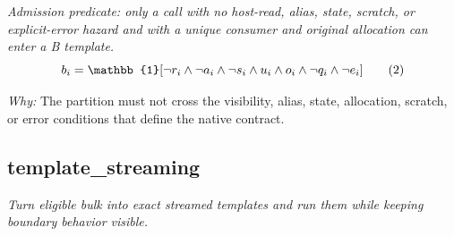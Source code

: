 \documentclass[10pt,a4paper]{article}
\begin{document}
\begin{enumerate}[leftmargin=*,start=1]
\noindent\emph{Admission predicate: only a call with no host-read, alias, state, scratch, or explicit-error hazard and with a unique consumer and original allocation can enter a B template.}
\begin{equation}
\resizebox{\ifdim\width>\linewidth \linewidth\else\width\fi}{!}{$\displaystyle b_i = \mathbb{1}[\neg r_i \land \neg a_i \land \neg s_i \land u_i \land o_i \land \neg q_i \land \neg e_i]$} \tag{2}
\end{equation}
\par\emph{Why:} The partition must not cross the visibility, alias, state, allocation, scratch, or error conditions that define the native contract.
\end{enumerate}
\subsection*{template\_streaming}
\emph{Turn eligible bulk into exact streamed templates and run them while keeping boundary behavior visible.}
\end{document}
